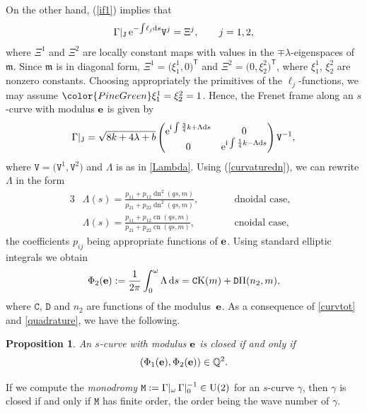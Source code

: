 \documentclass[pdftex]{sigma}
\newcommand\kk{k} %
\def\ri{\mathrm{i}}
\newcommand{\ds}{\,{\rm d}s}
\def\gam{\gamma} %
\newcommand\be{{\bf e}}
\newcommand\cn{\operatorname{cn}}
\newcommand\dn{\operatorname{dn}}
\newcommand\tomedit[1]{{\color{PineGreen}#1}}
\numberwithin{equation}{section}
\newtheorem{Proposition}[Theorem]{Proposition}
 { \theoremstyle{definition}
\newtheorem{Definition}[Theorem]{Definition}
\newtheorem{Note}[Theorem]{Note}
\newtheorem{Example}[Theorem]{Example}
\newtheorem{Remark}[Theorem]{Remark} }
\begin{document}
On the other hand, (\ref{if1}) implies that
\begin{equation*}%
\Gamma|_{{\rm J}}\, {\rm e}^{-{\int \! \ell_j {\rm d}s}} {\mathtt V}^j= \Xi^j,\qquad j=1,2,
\end{equation*}
where $\Xi^1$ and $\Xi^2$ are locally constant maps with values in the $\mp\lambda$-eigenspaces of ${\mathfrak m}$.
Since ${\mathfrak m}$ is in diagonal form, $\Xi^1=\bigl(\xi_1^1,0\bigr)^{\mathsf{T}}$ and $\Xi^2=\bigl(0,\xi_2^2\bigr)^{\mathsf{T}}$, where $\xi_1^1$, $\xi_2^2$ are nonzero constants. Choosing appropriately the primitives of the $\ell_j$-functions, we may assume $\tomedit{\xi^1_1}=\xi^2_2=1$. Hence, the Frenet frame along an $s$-curve with modulus $\be$ is given by
\begin{equation}\label{quadrature}
\Gamma|_{{\rm J}}=\sqrt{8\kk+4\lambda+b}
 \begin{pmatrix} {\rm e}^{\ri \int\frac{3}{4}\kk +\Lambda {\rm d}s} & 0 \\ 0 & {\rm e}^{\ri \int \frac{1}{4}\kk -\Lambda {\rm d}s}\end{pmatrix} {\mathtt V}^{-1},
\end{equation}
where ${\mathtt V}=\bigl({\mathtt V}^1,{\mathtt V}^2\bigr)$ and $\Lambda$ is as in \eqref{Lambda}.
Using (\ref{curvaturedn}), we can rewrite $\Lambda$ in the form
\begin{alignat*}{3}%
&\Lambda(s)=
 \frac{p_{11}+p_{12}\dn^2(qs,m)}{p_{21}+p_{22}\dn^2(qs,m)},\qquad && \text{dnoidal case,}& \\
&\Lambda(s)= \frac{p_{11}+p_{12}\cn(qs,m)}{p_{21}+p_{22}\cn(qs,m)},\qquad && \text{cnoidal case},&
\end{alignat*}
the coefficients $p_{ij}$ being appropriate functions of $\be$. Using standard elliptic integrals we obtain
\[
\Phi_2(\be):=\frac{1}{2\pi}\int_0^{\omega} \Lambda \ds={\mathtt C}{\rm K}(m)+{\mathtt D}\Pi(n_2,m),
\]
where ${\mathtt C}$, ${\mathtt D}$ and $n_2$ are functions of the modulus~$\be$. As a consequence of \eqref{curvtot} and \eqref{quadrature}, we have the following.

\begin{Proposition} An $s$-curve with modulus $\be$ is closed if and only if
\[(\Phi_1(\be),\Phi_2(\be))\in {\mathbb Q}^2.\]\end{Proposition}

\begin{Remark}%
If we compute the {\it monodromy} ${\mathtt M}:=\Gamma|_{\omega}\, \Gamma|_0^{-1}\in {\rm U}(2)$ for an $s$-curve $\gam$, then $\gam$ is closed if and only if ${\mathtt M}$ has finite order, the order
being the wave number of $\gam$.\end{Remark}
\end{document}
